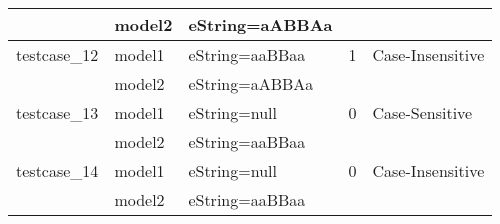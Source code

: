 \documentclass[a4paper]{article}
\begin{document}
\begin{longtable}{|l|l|l|l|l|}
\hline
             & model2 & eString=aABBAa & &\\
\hline
\hline
testcase\_12 & model1 & eString=aaBBaa & 1 & Case-Insensitive\\
\hline
             & model2 & eString=aABBAa & &\\
\hline
\hline
testcase\_13 & model1 & eString=null & 0 & Case-Sensitive\\
\hline
             & model2 & eString=aaBBaa & &\\
\hline
\hline
testcase\_14 & model1 & eString=null & 0 & Case-Insensitive\\
\hline
             & model2 & eString=aaBBaa & &\\
\hline

\end{longtable}
\end{document}
